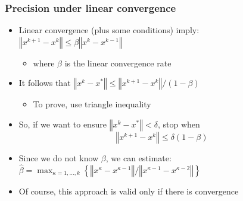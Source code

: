 \documentclass[bigger]{beamer}
\begin{document}
\begin{frame}%

\frametitle{Precision under linear convergence}

\begin{itemize}
\item Linear convergence (plus some conditions) imply: \newline
$\left\Vert x^{k+1}-x^{k}\right\Vert \leq \beta \left\Vert
x^{k}-x^{k-1}\right\Vert $

\begin{itemize}
\item where $\beta $ is the linear convergence rate
\end{itemize}

\item It follows that $\left\Vert x^{k}-x^{\ast }\right\Vert \leq \left\Vert
x^{k+1}-x^{k}\right\Vert /\left( 1-\beta \right) $

\begin{itemize}
\item To prove, use triangle inequality
\end{itemize}

\item So, if we want to ensure $\left\Vert x^{k}-x^{\ast }\right\Vert
<\delta $, stop when%
\begin{equation*}
\left\Vert x^{k+1}-x^{k}\right\Vert \leq \delta \left( 1-\beta \right)
\end{equation*}

\item Since we do not know $\beta $, we can estimate: $\hat{\beta}%
=\max_{\kappa =1,...,k}\left\{ \left\Vert x^{\kappa }-x^{\kappa
-1}\right\Vert /\left\Vert x^{\kappa -1}-x^{\kappa -2}\right\Vert \right\} $

\item Of course, this approach is valid only if there is convergence
\end{itemize}

\end{frame}
\end{document}
